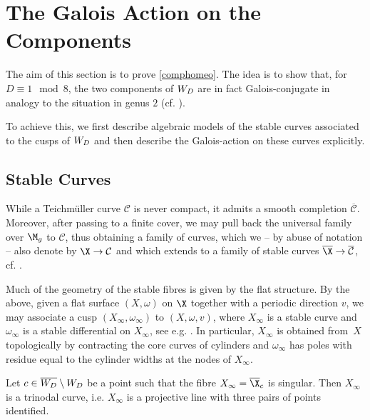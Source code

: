 \documentclass{amsart}
\makeatletter
\newcommand*{\@gobblenexttocentry}[9]{}
\newcommand*{\@gobblenexttocentry}[4]{}
\newcommand*{\addsubsection}{%
    \addtocontents{toc}{\protect\@gobblenexttocentry}%
    \subsection*}
\newcommand{\CC}{\mathcal{C}}
\def\q#1{\textcolor{red}{[?? #1 ??]}}
\makeatother
\begin{document}

\section{The Galois Action on the Components}
\label{galoisaction}

The aim of this section is to prove \autoref{comphomeo}. The idea is to show that, for $D\equiv 1\mod 8$, the two components of $\W$ are in fact Galois-conjugate in analogy to the situation in genus $2$ (cf. \cite[Theorem 3.3]{BMFuchs}).

To achieve this, we first describe algebraic models of the stable curves associated to the cusps of $\W$ and then describe the Galois-action on these curves explicitly.

%

\addsubsection{Stable Curves} While a Teichmüller curve $\CC$ is never compact, it admits a smooth completion $\overline{\CC}$. Moreover, after passing to a finite cover, we may pull back the universal family over $\M_g$ to $\CC$, thus obtaining a family of curves, which we -- by abuse of notation -- also denote by $\X\rightarrow\CC$ and which extends to a family of stable curves $\overline{\X}\rightarrow\overline{\CC}$, cf. \cite[\S 1.4]{VHS}. 

Much of the geometry of the stable fibres is given by the flat structure. By the above, given a flat surface $(X,\omega)$ on $\X$ together with a periodic direction $v$, we may associate a cusp $(X_\infty,\omega_\infty)$ to $(X,\omega,v)$, where $X_\infty$ is a stable curve and $\omega_\infty$ is a stable differential on $X_\infty$, see e.g. \cite[\S 2.5 and \S 5.4]{parkcity}. In particular, $X_\infty$ is obtained from~$X$ topologically by contracting the core curves of cylinders and $\omega_\infty$ has poles with residue equal to the cylinder widths at the nodes of $X_\infty$.

\begin{lemma}\label{stablefibres}
Let $c\in\overline{\W}\setminus\W$ be a point such that the fibre $X_\infty=\overline{\X}_c$ is singular. Then $X_\infty$ is a trinodal curve, i.e. $X_\infty$ is a projective line with three pairs of points identified.
\end{lemma}
\end{document}
